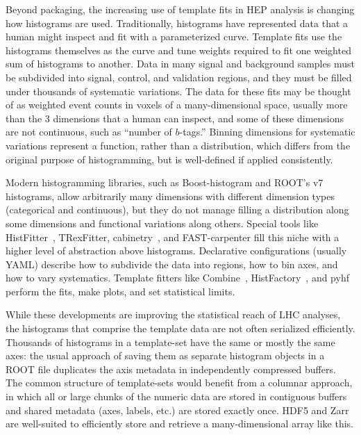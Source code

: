 \documentclass[12pt,a4paper]{article}
\begin{document}
Beyond packaging, the increasing use of template fits in HEP analysis is changing how histograms are used. Traditionally, histograms have represented data that a human might inspect and fit with a parameterized curve. Template fits use the histograms themselves as the curve and tune weights required to fit one weighted sum of histograms to another. Data in many signal and background samples must be subdivided into signal, control, and validation regions, and they must be filled under thousands of systematic variations. The data for these fits may be thought of as weighted event counts in voxels of a many-dimensional space, usually more than the 3 dimensions that a human can inspect, and some of these dimensions are not continuous, such as ``number of $b$-tags.'' Binning dimensions for systematic variations represent a function, rather than a distribution, which differs from the original purpose of histogramming, but is well-defined if applied consistently.

Modern histogramming libraries, such as Boost-histogram and ROOT's v7 histograms, allow arbitrarily many dimensions with different dimension types (categorical and continuous), but they do not manage filling a distribution along some dimensions and functional variations along others. Special tools like HistFitter~\cite{Besjes:2015vns}, TRexFitter, cabinetry~\cite{cranmer_kyle_2021_4627038}, and FAST-carpenter fill this niche with a higher level of abstraction above histograms. Declarative configurations (usually YAML) describe how to subdivide the data into regions, how to bin axes, and how to vary systematics. Template fitters like Combine~\cite{CMS-NOTE-2011-005}, HistFactory~\cite{Cranmer:2012sba}, and pyhf~\cite{pyhf_joss} perform the fits, make plots, and set statistical limits.

While these developments are improving the statistical reach of LHC analyses, the histograms that comprise the template data are not often serialized efficiently. Thousands of histograms in a template-set have the same or mostly the same axes: the usual approach of saving them as separate histogram objects in a ROOT file duplicates the axis metadata in independently compressed buffers. The common structure of template-sets would benefit from a columnar approach, in which all or large chunks of the numeric data are stored in contiguous buffers and shared metadata (axes, labels, etc.) are stored exactly once. HDF5 and Zarr are well-suited to efficiently store and retrieve a many-dimensional array like this.
\end{document}
